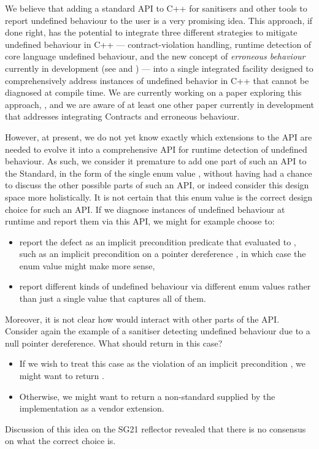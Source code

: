 We believe that adding a standard API to C++ for sanitisers and other tools to report undefined behaviour to the user is a very promising idea. This approach, if done right, has the potential to integrate three different strategies to mitigate undefined behaviour in C++ --- contract-violation handling, runtime detection of core language undefined behaviour, and the new concept of \emph{erroneous behaviour} currently in development (see \cite{P2795R4} and \cite{P2973R0}) --- into a single integrated facility designed to comprehensively address instances of undefined behavior in C++ that cannot be diagnosed at compile time. We are currently working on a paper exploring this approach, \cite{D3100R0}, and we are aware of at least one other paper currently in development that addresses integrating Contracts and erroneous behaviour.

However, at present, we do not yet know exactly which extensions to the \mbox{} \mbox{} API are needed to evolve it into a comprehensive API for runtime detection of undefined behaviour. As such, we consider it premature to add one part of such an API to the Standard, in the form of the single enum value \mbox{}, without having had a chance to discuss the other possible parts of such an API, or indeed consider this design space more holistically. It is not certain that this enum value is the correct design choice for such an API. If we diagnose instances of undefined behaviour at runtime and report them via this API, we might for example choose to:
\begin{itemize}
\item report the defect as an implicit precondition predicate that evaluated to , such as an implicit precondition  on a pointer dereference , in which case the enum value  might make more sense,
\item report different kinds of undefined behaviour via different enum values rather than just a single value that captures all of them.
\end{itemize}
Moreover, it is not clear how \mbox{} would interact with other parts of the \mbox{} API. Consider again the example of a sanitiser detecting undefined behaviour due to a null pointer dereference. What should  return in this case?
\begin{itemize}
\item If we wish to treat this case as the violation of an implicit precondition , we might want to return .
\item Otherwise, we might want to return a non-standard  supplied by the implementation as a vendor extension.
\end{itemize}
Discussion of this idea on the SG21 reflector revealed that there is no consensus on what the correct choice is.

